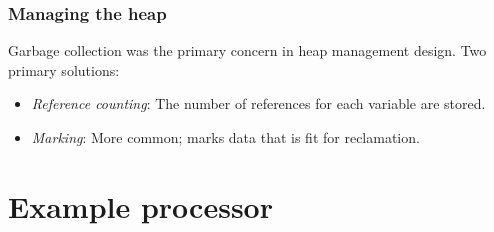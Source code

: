 \documentclass{beamer}
\begin{document}
\begin{frame}
	\frametitle{Managing the heap}
	Garbage collection was the primary concern in heap management design. Two primary solutions:
	\newline
	\begin{itemize}
		\item \emph{Reference counting}: The number of references for each variable are stored.
		\newline
		\item \emph{Marking}: More common; marks data that is fit for reclamation.
	\end{itemize}
\end{frame}

\section{Example processor}
\end{document}
